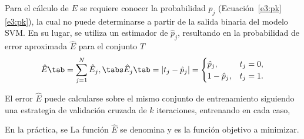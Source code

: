 Para el cálculo de $E$ se requiere conocer la probabilidad $p_j$
(\iflatexml{}Ecuación~\ref{e3:pk}\else\autoref{e3:pk}\fi), la cual no
puede determinarse a partir de la salida binaria del modelo SVM.  En
su lugar, se utiliza un estimador de $\hat{p}_j$, resultando en la
probabilidad de error aproximada $\hat{E}$ para el conjunto $T$
%
\begin{align}
  \label{Err1}
  \hat{E}\tab=\sum_{j=1}^{N}\hat{E}_j,\tabs
  \hat{E}_j\tab=|t_j-\hat{p}_j| =
  \begin{cases}
    \hat{p}_j,&t_j=0,\\1-\hat{p}_j,&t_j=1.
  \end{cases}
\end{align}
%

El error $\hat{E}$ puede calcularse sobre el mismo conjunto de entrenamiento
siguiendo una estrategia de validación cruzada de $k$ iteraciones, entrenando
en cada caso, 

En la práctica, se 
La función $\hat{E}$ se denomina  y es la función objetivo a
minimizar.
